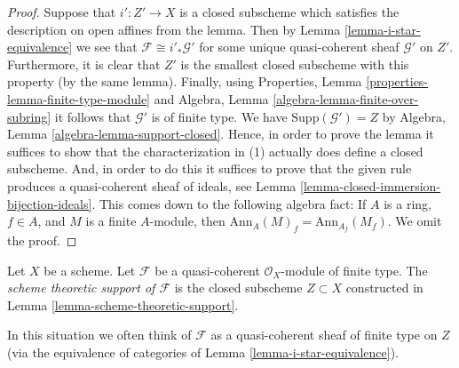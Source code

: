 \begin{proof}
Suppose that $i' : Z' \to X$ is a closed subscheme which satisfies the
description on open affines from the lemma. Then by
Lemma \ref{lemma-i-star-equivalence}
we see that $\mathcal{F} \cong i'_*\mathcal{G}'$ for some unique
quasi-coherent sheaf $\mathcal{G}'$ on $Z'$. Furthermore, it is clear
that $Z'$ is the smallest closed subscheme with this property (by the
same lemma). Finally, using
Properties, Lemma \ref{properties-lemma-finite-type-module}
and
Algebra, Lemma \ref{algebra-lemma-finite-over-subring}
it follows that $\mathcal{G}'$ is of finite type. We have
$\text{Supp}(\mathcal{G}') = Z$ by
Algebra, Lemma \ref{algebra-lemma-support-closed}.
Hence, in order to prove the lemma it suffices to show that
the characterization in (1) actually does define a closed subscheme.
And, in order to do this it suffices to prove that the given rule
produces a quasi-coherent sheaf of ideals, see
Lemma \ref{lemma-closed-immersion-bijection-ideals}.
This comes down to the following algebra fact: If $A$ is a ring, $f \in A$,
and $M$ is a finite $A$-module, then
$\text{Ann}_A(M)_f = \text{Ann}_{A_f}(M_f)$.
We omit the proof.
\end{proof}

\begin{definition}
\label{definition-scheme-theoretic-support}
Let $X$ be a scheme. Let $\mathcal{F}$ be a quasi-coherent
$\mathcal{O}_X$-module of finite type. The {\it scheme theoretic support
of $\mathcal{F}$} is the closed subscheme $Z \subset X$ constructed in
Lemma \ref{lemma-scheme-theoretic-support}.
\end{definition}

\noindent
In this situation we often think of $\mathcal{F}$ as a quasi-coherent
sheaf of finite type on $Z$ (via the equivalence of categories of
Lemma \ref{lemma-i-star-equivalence}).













